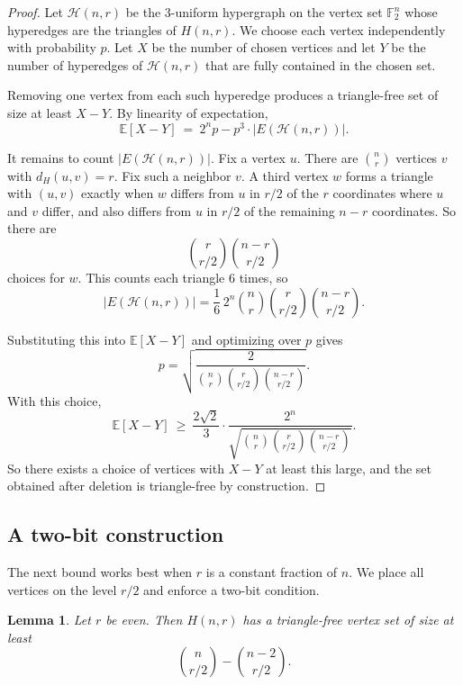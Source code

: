 \documentclass[11pt]{article}
\theoremstyle{plain}
\newtheorem{lemma}{Lemma}
\newcommand{\F}{\mathbb{F}}
\newcommand{\dist}{d_H}
\begin{document}
\begin{proof}
Let $\mathcal{H}(n,r)$ be the $3$-uniform hypergraph on the vertex set $\F_2^n$ whose hyperedges are the triangles of $H(n,r)$.
We choose each vertex independently with probability $p$.
Let $X$ be the number of chosen vertices and let $Y$ be the number of hyperedges of $\mathcal{H}(n,r)$ that are fully contained in the chosen set.

Removing one vertex from each such hyperedge produces a triangle-free set of size at least $X-Y$.
By linearity of expectation,
\[
\mathbb{E}[X-Y]\ =\ 2^n p - p^3\cdot |E(\mathcal{H}(n,r))|.
\]

It remains to count $|E(\mathcal{H}(n,r))|$.
Fix a vertex $u$.
There are $\binom{n}{r}$ vertices $v$ with $\dist(u,v)=r$.
Fix such a neighbor $v$.
A third vertex $w$ forms a triangle with $(u,v)$ exactly when $w$ differs from $u$ in $r/2$ of the $r$ coordinates where $u$ and $v$ differ, and also differs from $u$ in $r/2$ of the remaining $n-r$ coordinates.
So there are
\[
\binom{r}{r/2}\binom{n-r}{r/2}
\]
choices for $w$.
This counts each triangle $6$ times, so
\[
|E(\mathcal{H}(n,r))|
=\frac{1}{6}\,2^n\binom{n}{r}\binom{r}{r/2}\binom{n-r}{r/2}.
\]

Substituting this into $\mathbb{E}[X-Y]$ and optimizing over $p$ gives
\[
p=\sqrt{\frac{2}{\binom{n}{r}\binom{r}{r/2}\binom{n-r}{r/2}}}.
\]
With this choice,
\[
\mathbb{E}[X-Y]\ \ge\
\frac{2\sqrt{2}}{3}\cdot
\frac{2^n}{\sqrt{\binom{n}{r}\binom{r}{r/2}\binom{n-r}{r/2}}}.
\]
So there exists a choice of vertices with $X-Y$ at least this large, and the set obtained after deletion is triangle-free by construction.
\end{proof}

\subsection{A two-bit construction}

The next bound works best when $r$ is a constant fraction of $n$.
We place all vertices on the level $r/2$ and enforce a two-bit condition.

\begin{lemma}\label{lem:twobit}
Let $r$ be even.
Then $H(n,r)$ has a triangle-free vertex set of size at least
\[
\binom{n}{r/2}-\binom{n-2}{r/2}.
\]
\end{lemma}
\end{document}
